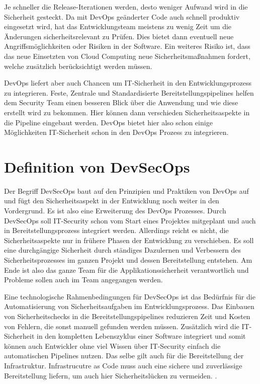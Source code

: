 Je schneller die Release-Iterationen werden, desto weniger Aufwand wird in die Sicherheit gesteckt. Da mit DevOps geänderter Code auch schnell produktiv eingesetzt wird, hat das Entwicklungsteam meistens zu wenig Zeit um die Änderungen sicherheitsrelevant zu Prüfen. Dies bietet dann eventuell neue Angriffsmöglichkeiten oder Risiken in der Software.
Ein weiteres Risiko ist, dass das neue Einsetzten von Cloud Computing neue Sicherheitsmaßnahmen fordert, welche zusätzlich berücksichtigt werden müssen.


DevOps liefert aber auch Chancen um IT-Sicherheit in den Entwicklungsprozess zu integrieren.
Feste, Zentrale und Standardisierte Bereitstellungspipelines helfen dem Security Team einen besseren Blick über die Anwendung und wie diese erstellt wird zu bekommen. Hier können dann verschieden Sicherheitsaspekte in die Pipeline eingebaut werden. DevOps bietet hier also schon einige Möglichkeiten IT-Sicherheit schon in den DevOps Prozess zu integrieren. \cite{grey}

\section{Definition von DevSecOps}
Der Begriff DevSecOps baut auf den Prinzipien und Praktiken von DevOps auf und fügt den Sicherheitsaspekt in der Entwicklung noch weiter in den Vordergrund. Es ist also eine Erweiterung des DevOps Prozesses. Durch DevSecOps soll IT-Security schon vom Start eines Projektes mitgeplant und auch in Bereitstellungsprozess integriert werden. Allerdings reicht es nicht, die Sicherheitsaspekte nur in frühere Phasen der Entwicklung zu verschieben. Es soll eine durchgängige Sicherheit durch ständiges Dazulernen und Verbessern des Sicherheitsprozesses im ganzen Projekt und dessen Bereitstellung entstehen. \cite{grey}
Am Ende ist also das ganze Team für die Applikationssicherheit verantwortlich und Probleme sollen auch im Team angegangen werden. \cite{devsecops-techniques}

Eine technologische Rahmenbedingungen für DevSecOps ist das Bedürfnis für die Automatisierung von Sicherheitsaufgaben im Entwicklungsprozess. Das Einbauen von Sicherheitschecks in die Bereitstellungspipelines reduzieren Zeit und Kosten von Fehlern, die sonst manuell gefunden werden müssen. Zusätzlich wird die IT-Sicherheit in den kompletten Lebenszyklus einer Software integriert und somit können auch Entwickler ohne viel Wissen über IT-Security einfach die automatischen Pipelines nutzen. Das selbe gilt auch für die Bereitstellung der Infrastruktur. Infrastrucutre as Code muss auch eine sichere und zuverlässige Bereitstellung liefern, um auch hier Sicherheitslücken zu vermeiden. \cite{grey}.


